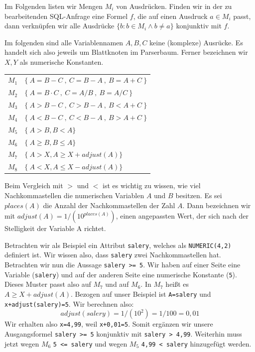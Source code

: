 Im Folgenden listen wir Mengen $M_i$ von Ausdrücken. Finden wir in der zu bearbeitenden SQL-Anfrage eine Formel $f$, die auf einen Ausdruck $a\in M_i$ passt, dann verknüpfen wir alle Ausdrücke $\{b : b\in M_i \wedge b \neq a\}$ konjunktiv mit $f$.

Im folgenden sind alle Variablennamen $A,B,C$ keine (komplexe) Ausrücke. Es handelt sich also jeweils um Blattknoten im Parserbaum. Ferner bezeichnen wir $X,Y$ als numerische Konstanten.\\

\begin{tabular}{ll}
$M_1$ & $\{\ A=B-C\ ,\ C=B-A\ ,\ B=A+C\ \}$\\
$M_2$ & $\{\ A=B\cdot C\ ,\ C=A / B\ ,\ B=A / C\ \}$\\
$M_3$ & $\{\ A>B-C\ ,\ C>B-A\ ,\ B<A+C\ \}$\\
$M_4$ & $\{\ A<B-C\ ,\ C<B-A\ ,\ B>A+C\ \}$\\
$M_5$ & $\{\ A>B, B<A \}$\\
$M_6$ & $\{\ A\geq B, B\leq A \}$\\
$M_7$ & $\{\ A>X, A\geq X+\mathit{adjust}(A) \}$\\
$M_8$ & $\{\ A<X, A\leq X-\mathit{adjust}(A) \}$\\

\end{tabular}

Beim Vergleich mit $>$ und $<$ ist es wichtig zu wissen, wie viel Nachkommastellen die numerischen Variablen $A$ und $B$ besitzen. Es sei $\mathit{places}(A)$ die Anzahl der Nachkommastellen der Zahl $A$. Dann bezeichnen wir mit $\mathit{adjust}(A) = 1 / (10^{\mathit{places}(A)})$, einen angepassten Wert, der sich nach der Stelligkeit der Variable A richtet.

Betrachten wir als Beispiel ein Attribut \verb|salery|, welches als \verb|NUMERIC(4,2)| definiert ist. Wir wissen also, dass \verb|salery| zwei Nachkommastellen hat. Betrachten wir nun die Aussage \verb|salery >= 5|.
Wir haben auf einer Seite eine Variable (\verb|salery|) und auf der anderen Seite eine numerische Konstante (\verb|5|). Dieses Muster passt also auf $M_7$ und auf $M_6$. In $M_7$ heißt es $A\geq X+\mathit{adjust}(A)$. Bezogen auf unser Beispiel ist \verb|A=salery| und \verb|x+adjust(salery)=5|. Wir berechnen also: 
$$\mathit{adjust}(\mathit{salery}) = 1 / (10^{2}) = 1/100 = 0,01$$
Wir erhalten also \verb|x=4,99|, weil \verb|x+0,01=5|. Somit ergänzen wir unsere Ausgangsformel \verb|salery >= 5| konjunktiv mit \verb|salery > 4,99|. Weiterhin muss jetzt wegen $M_6$ \verb|5 <= salery| und wegen $M_5$ \verb|4,99 < salery| hinzugefügt werden.

